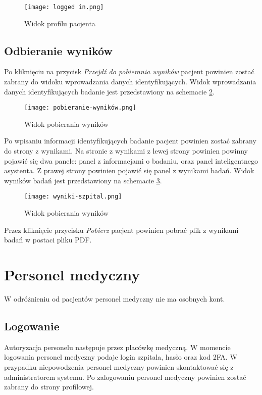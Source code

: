 \documentclass{documentation}
\begin{document}
\begin{figure}[h]
    \centering
    \texttt{[image: logged in.png]}
    \caption{Widok profilu pacjenta\label{fig:patientProfile}}
\end{figure}

\subsection{Odbieranie wyników}

Po kliknięciu na przycisk \textit{Przejdź do pobierania wyników} pacjent powinien zostać zabrany do widoku wprowadzania danych identyfikujących.
Widok wprowadzania danych identyfikujących badanie jest przedstawiony na schemacie \ref{fig:patientData}.

\begin{figure}[h]
    \centering
    \texttt{[image: pobieranie-wyników.png]}
    \caption{Widok pobierania wyników\label{fig:patientData}}
\end{figure}

Po wpisaniu informacji identyfikujących badanie pacjent powinien zostać zabrany do strony z wynikami.
Na stronie z wynikami z lewej strony powinien powinny pojawić się dwa panele: panel z informacjami o badaniu, oraz panel inteligentnego asystenta.
Z prawej strony powinien pojawić się panel z wynikami badań.
Widok wyników badań jest przedstawiony na schemacie \ref{fig:results}.

\begin{figure}[h]
    \centering
    \texttt{[image: wyniki-szpital.png]}
    \caption{Widok pobierania wyników\label{fig:results}}
\end{figure}

Przez kliknięcie przycisku \textit{Pobierz} pacjent powinien pobrać plik z wynikami badań w postaci pliku PDF.

\section{Personel medyczny}

W odróżnieniu od pacjentów personel medyczny nie ma osobnych kont.

\subsection{Logowanie}

Autoryzacja personelu następuje przez placówkę medyczną.
W momencie logowania personel medyczny podaje login szpitala, hasło oraz kod 2FA.
W przypadku niepowodzenia personel medyczny powinien skontaktować się z administratorem systemu.
Po zalogowaniu personel medyczny powinien zostać zabrany do strony profilowej.
\end{document}
